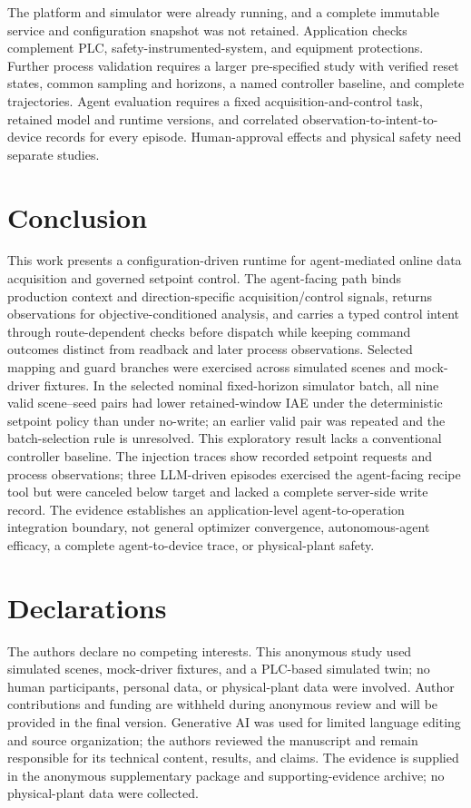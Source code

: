 \documentclass[journal]{IEEEtran}
\begin{document}
The platform and simulator were already running, and a complete immutable service and configuration snapshot was not retained. Application checks complement PLC, safety-instrumented-system, and equipment protections. Further process validation requires a larger pre-specified study with verified reset states, common sampling and horizons, a named controller baseline, and complete trajectories. Agent evaluation requires a fixed acquisition-and-control task, retained model and runtime versions, and correlated observation-to-intent-to-device records for every episode. Human-approval effects and physical safety need separate studies.

\section{Conclusion}
\label{sec:conclusion}
This work presents a configuration-driven runtime for agent-mediated online data acquisition and governed setpoint control. The agent-facing path binds production context and direction-specific acquisition/control signals, returns observations for objective-conditioned analysis, and carries a typed control intent through route-dependent checks before dispatch while keeping command outcomes distinct from readback and later process observations. Selected mapping and guard branches were exercised across simulated scenes and mock-driver fixtures. In the selected nominal fixed-horizon simulator batch, all nine valid scene--seed pairs had lower retained-window IAE under the deterministic setpoint policy than under no-write; an earlier valid pair was repeated and the batch-selection rule is unresolved. This exploratory result lacks a conventional controller baseline. The injection traces show recorded setpoint requests and process observations; three LLM-driven episodes exercised the agent-facing recipe tool but were canceled below target and lacked a complete server-side write record. The evidence establishes an application-level agent-to-operation integration boundary, not general optimizer convergence, autonomous-agent efficacy, a complete agent-to-device trace, or physical-plant safety.
 
\section*{Declarations}
The authors declare no competing interests. This anonymous study used simulated scenes, mock-driver fixtures, and a PLC-based simulated twin; no human participants, personal data, or physical-plant data were involved. Author contributions and funding are withheld during anonymous review and will be provided in the final version. Generative AI was used for limited language editing and source organization; the authors reviewed the manuscript and remain responsible for its technical content, results, and claims. The evidence is supplied in the anonymous supplementary package and supporting-evidence archive; no physical-plant data were collected.



\end{document}
